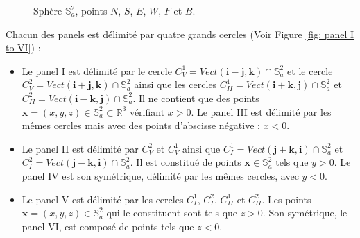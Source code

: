 \begin{figure}[ht]
\begin{center}
\end{center}
\caption{Sphère $\mathbb{S}_a^2$, points $N$, $S$, $E$, $W$, $F$ et $B$.}
\label{fig: sphere NSEWFB}
\end{figure}


Chacun des panels est délimité par quatre grands cercles (Voir Figure \ref{fig: panel I to VI}) :

\begin{itemize}
\item Le panel I est délimité par le cercle $C_V^1 = Vect(\mathbf{i}-\mathbf{j}, \mathbf{k}) \cap \mathbb{S}_a^2$ et le cercle $C_V^2 = Vect(\mathbf{i}+\mathbf{j}, \mathbf{k}) \cap \mathbb{S}_a^2$ ainsi que les cercles $C_{II}^1 = Vect(\mathbf{i}+\mathbf{k}, \mathbf{j}) \cap \mathbb{S}_a^2$ et $C_{II}^2 = Vect(\mathbf{i}-\mathbf{k}, \mathbf{j}) \cap \mathbb{S}_a^2$. Il ne contient que des points $\mathbf{x}=(x,y,z) \in \mathbb{S}_a^2 \subset \mathbb{R}^3$ vérifiant $x>0$. Le panel III est délimité par les mêmes cercles mais avec des points d'abscisse négative : $x<0$.
\item Le panel II est délimité par $C_V^2$ et $C_V^1$ ainsi que $C_I^1=Vect(\mathbf{j}+\mathbf{k},\mathbf{i}) \cap \mathbb{S}_a^2$ et $C_I^2=Vect(\mathbf{j}-\mathbf{k},\mathbf{i}) \cap \mathbb{S}_a^2$. Il est constitué de points $\mathbf{x} \in \mathbb{S}_a^2$ tels que $y>0$. Le panel IV est son symétrique, délimité par les mêmes cercles, avec $y<0$.
\item Le panel V est délimité par les cercles $C_I^1$, $C_I^2$, $C_{II}^1$ et $C_{II}^2$. Les points $\mathbf{x} = (x,y,z) \in \mathbb{S}_a^2$ qui le constituent sont tels que $z>0$. Son symétrique, le panel VI, est composé de points tels que $z<0$.


\end{itemize}

